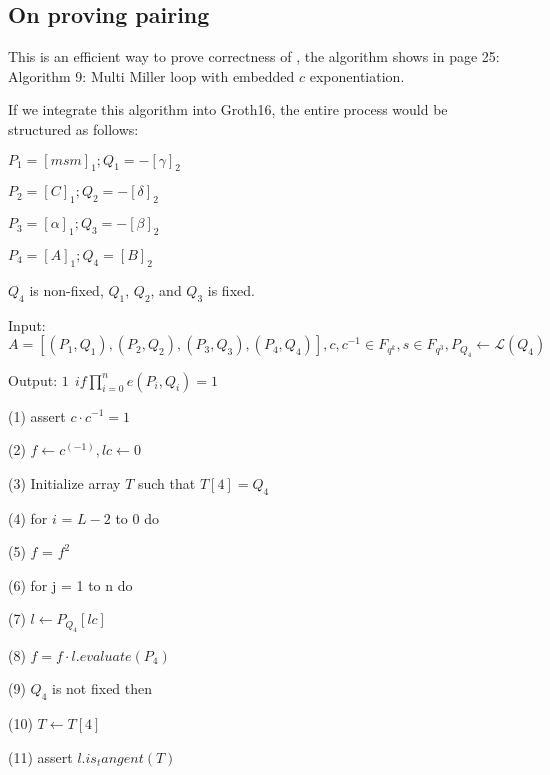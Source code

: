 \subsection{On proving pairing}

This is an efficient way to prove correctness of \cite{website:On-proving-pairing}, the algorithm shows in page 25: Algorithm 9: Multi Miller loop with embedded $c$ exponentiation. 

If we integrate this algorithm into Groth16, the entire process would be structured as follows:	\newline

 $\displaystyle P_1 = [msm]_1; Q_1 = -[\gamma]_2 $ \newline

 $\displaystyle P_2 = [C]_1; Q_2 = -[\delta]_2 $

 $\displaystyle P_3 = [\alpha]_1; Q_3 = -[\beta]_2 $

 $\displaystyle P_4 = [A]_1; Q_4 = [B]_2 $


$Q_4$ is non-fixed, $Q_1$, $Q_2$, and $Q_3$ is fixed. \newline


Input: $\displaystyle A = [(P_1,Q_1), (P_2,Q_2), (P_3,Q_3),(P_4,Q_4)],c, c^{-1} \in F_{q^k},s \in F_{q^3},P_{Q_4} \leftarrow \mathcal{L}(Q_4)$ \newline

Output: $\displaystyle 1 \ \ if \prod_{i=0}^{n}e(P_i, Q_i) = 1 $  \newline

(1) assert $\displaystyle c \cdot c^{-1} = 1 $ 

(2) $\displaystyle f \leftarrow c^(-1), lc \leftarrow 0 $ 

(3) Initialize array $T$ such that $\displaystyle T[4] = Q_4 $

(4) for $i$ = $L-2$ to $0$ do 

(5) \indent $f$ = $f^2$ 

(6) \indent for j = 1 to n do 

(7) \indent \indent $\displaystyle l \leftarrow P_{Q_4}[lc] $ 

(8) \indent \indent $\displaystyle f = f \cdot l.evaluate(P_4) $  

(9) \indent \indent $Q_4$ is not fixed then 

(10) \indent \indent \indent $\displaystyle T \leftarrow T[4] $ 

(11) \indent \indent \indent assert $\displaystyle l.is_tangent(T) $ 

